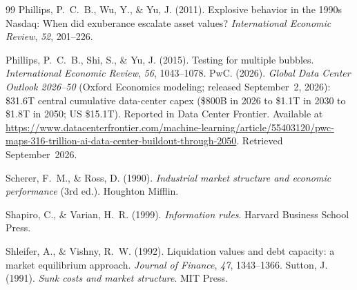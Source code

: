 \documentclass[11pt,a4paper]{article}
\begin{document}
\begin{thebibliography}{99}
Phillips, P.~C.~B., Wu, Y., \& Yu, J. (2011).
Explosive behavior in the 1990s Nasdaq: When did exuberance escalate asset values?
\emph{International Economic Review}, \emph{52}, 201--226.

Phillips, P.~C.~B., Shi, S., \& Yu, J. (2015).
Testing for multiple bubbles.
\emph{International Economic Review}, \emph{56}, 1043--1078.
PwC. (2026).
\emph{Global Data Center Outlook 2026--50} (Oxford Economics modeling;
released September~2, 2026): \$31.6T central cumulative data-center capex
(\$800B in 2026 to \$1.1T in 2030 to \$1.8T in 2050; US \$15.1T).
Reported in Data Center Frontier. Available at
\url{https://www.datacenterfrontier.com/machine-learning/article/55403120/pwc-maps-316-trillion-ai-data-center-buildout-through-2050}.
Retrieved September~2026.

Scherer, F.~M., \& Ross, D. (1990).
\emph{Industrial market structure and economic performance} (3rd ed.).
Houghton Mifflin.

Shapiro, C., \& Varian, H.~R. (1999).
\emph{Information rules}.
Harvard Business School Press.

Shleifer, A., \& Vishny, R.~W. (1992).
Liquidation values and debt capacity: a market equilibrium approach.
\emph{Journal of Finance}, \emph{47}, 1343--1366.
Sutton, J. (1991).
\emph{Sunk costs and market structure}.
MIT Press.








\end{thebibliography}
\end{document}
